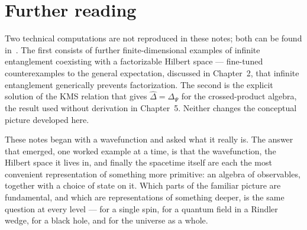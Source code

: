 \section*{Further reading}

Two technical computations are not reproduced in these notes; both can be found in~\cite{Liu2025}. The first
consists of further finite-dimensional examples of infinite entanglement coexisting with a factorizable Hilbert
space — fine-tuned counterexamples to the general expectation, discussed in Chapter~2, that infinite
entanglement generically prevents factorization. The second is the explicit solution of the KMS relation that
gives $\widehat\Delta=\Delta_\Psi$ for the crossed-product algebra, the result used without derivation in
Chapter~5. Neither changes the conceptual picture developed here.

\bigskip
\noindent These notes began with a wavefunction and asked what it really is. The answer that emerged, one
worked example at a time, is that the wavefunction, the Hilbert space it lives in, and finally the spacetime
itself are each the most convenient representation of something more primitive: an algebra of observables,
together with a choice of state on it. Which parts of the familiar picture are fundamental, and which are
representations of something deeper, is the same question at every level — for a single spin, for a quantum
field in a Rindler wedge, for a black hole, and for the universe as a whole.
